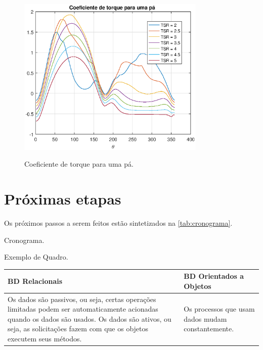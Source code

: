 \begin{figure}
	\centering
	\caption{Coeficiente de torque para uma pá.}
	\includegraphics[width=0.8\textwidth]{figuras/resultCtPaFrontPost.eps}
	\label{fig:resultCtPaFrontPost}
\end{figure}

\section{Próximas etapas}
\label{sec:trabalhosFuturos}

Os próximos passos a serem feitos estão sintetizados na \autoref{tab:cronograma}.

\begin{table}[H]
	\centering
	\caption{Cronograma.}
	\label{tab:cronograma}
	
\end{table}

\begin{quadro}[!htb]
	\centering
	\caption{Exemplo de Quadro.\label{qua:quadro-exemplo1}}
	\begin{tabular}{|p{7cm}|p{7cm}|}
		\hline
		\textbf{BD Relacionais} & \textbf{BD Orientados a Objetos} \\
		\hline
		Os dados são passivos, ou seja, certas operações limitadas podem ser automaticamente acionadas quando os dados são usados. Os dados são ativos, ou seja, as solicitações fazem com que os objetos executem seus métodos. & Os processos que usam dados mudam constantemente. \\
		\hline
	\end{tabular}
\end{quadro}